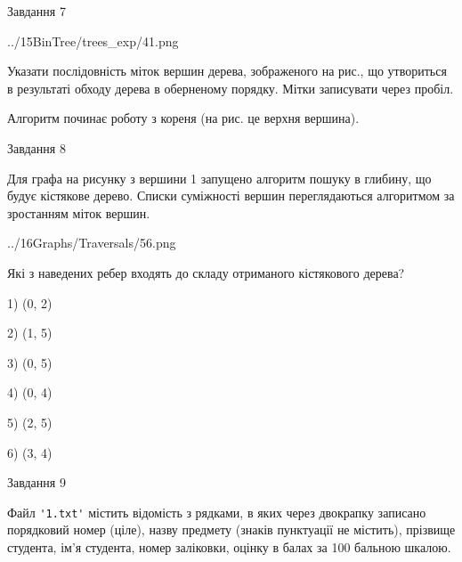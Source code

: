\documentclass[12pt, ukrainian]{article}
\def\code#1{\Verb!#1!}
\begin{document}
{\vspace{10mm}\par

\newpage
\begin{minipage}[t]{9.7cm}
               
{\begin{center}Завдання {7}\end{center}}
\vspace{-4mm}

\begin{center}
	{../15BinTree/trees_exp/41.png}
\end{center}
Указати послідовність міток вершин дерева, зображеного на рис., що утвориться в результаті обходу дерева в оберненому порядку. Мітки записувати через пробіл.\par Алгоритм починає роботу з кореня (на рис. це верхня вершина).\par

\end{minipage}
\vline \hspace{8mm}
\begin{minipage}[t]{8.0cm}
               
{\begin{center}Завдання {8}\end{center}}
\vspace{-4mm}
Для графа на рисунку з вершини 1 запущено алгоритм пошуку в глибину, що будує кістякове дерево. Списки суміжності вершин переглядаються алгоритмом за зростанням міток вершин.\par
\begin{center}
	{../16Graphs/Traversals/56.png}
\end{center}
\par Які з наведених ребер входять до складу отриманого кістякового дерева?\par
1) (0, 2)\par
2) (1, 5)\par
3) (0, 5)\par
4) (0, 4)\par
5) (2, 5)\par
6) (3, 4)\par
{\vskip 15pt} \par

\end{minipage}

               
{\begin{center}Завдання {9}\end{center}}
\vspace{-4mm}
Файл \code{'1.txt'} містить відомість з рядками, в яких через двокрапку записано поряд\-ковий номер (ціле), назву предмету (знаків пунктуації не містить), прізвище студента, ім'я студента, номер заліковки, оцінку в балах за 100 бальною шкалою.

}
\end{document}
